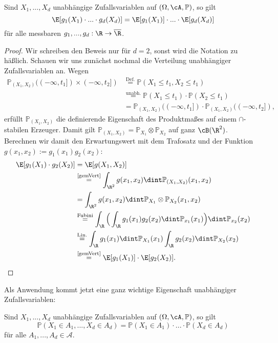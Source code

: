 \begin{satz}\label{un}
	Sind $X_1,...,X_d$ unabhängige Zufallsvariablen auf $(\Omega, \cA, \mathbb{P})$, so gilt
	$$ \E[g_1(X_1) \cdot ... \cdot g_d(X_d)] = \E[g_1(X_1)] \cdot ... \cdot \E[g_d(X_d)]$$
	f\"ur alle messbaren $g_1, ..., g_d: \R \to \overline \R$.
\end{satz}

\begin{proof}
	Wir schreiben den Beweis nur f\"ur $d=2$, sonst wird die Notation zu h\"a\ss lich. Schauen wir uns zun\"achst nochmal die Verteilung unabh\"angiger Zufallsvariablen an. Wegen
	 \begin{align*}
			\mathbb{P}_{(X_1,X_2)}((-\infty,t_1]) \times (-\infty,t_2]) 
			&\overset{\text{Def.}}{=} \mathbb{P}(X_1\leq t_1, X_2 \leq t_1) \\
			&\overset{\text{unabh.}}{=} \mathbb{P}(X_1\leq t_1) \cdot \mathbb{P}(X_2 \leq t_1) \\
			&= \mathbb{P}_{(X_1,X_2)}((-\infty,t_1]) \cdot \mathbb{P}_{(X_1,X_2)}((-\infty,t_2]),
		\end{align*}
		erf\"ullt $\mathbb{P}_{(X_1,X_2)}$ die definierende Eigenschaft des Produktma\ss es auf einem $\cap$-stabilen Erzeuger. Damit gilt $\mathbb{P}_{(X_1,X_2)} = \mathbb{P}_{X_1} \otimes \mathbb{P}_{X_2}$ auf ganz $\cB(\R^2)$. Berechnen wir damit den Erwartungswert mit dem Trafosatz und der Funktion $g(x_1,x_2):=g_1(x_1)g_2(x_2)$:
		 \begin{align*}
			\E[g_1(X_1) \cdot g_2(X_2)] &= \E[g(X_1,X_2)]\\
			&\overset{\text{\ref{gemVert}}}{=} \int_{\R^2} g(x_1,x_2) \dint \mathbb{P}_{(X_1,X_2)}(x_1,x_2)\\
			&= \int_{\R^2} g(x_1,x_2) \dint\mathbb{P}_{X_1} \otimes \mathbb{P}_{X_2}(x_1,x_2)\\
			&\overset{\text{Fubini}}{=} \int_{\R} \Big(\int_{\R} g_1(x_1) g_2(x_2) \dint\mathbb{P}_{x_1}(x_1)\Big) \dint\mathbb{P}_{x_2}(x_2)\\
			& \overset{\text{Lin.}}{=} \int_{\R} g_1(x_1) \dint\mathbb{P}_{X_1}(x_1) \int_{\R} g_2(x_2) \dint\mathbb{P}_{X_2}(x_2)\\
			&\overset{\text{\ref{gemVert}}}{=} \E[g_1(X_1)] \cdot \E[g_2(X_2)].
		\end{align*}
\end{proof}
Als Anwendung kommt jetzt eine ganz wichtige Eigenschaft unabh\"angiger Zufallsvariablen:
\begin{korollar}
	Sind $X_1,...,X_d$ unabhängige Zufallsvariablen auf $(\Omega, \cA, \mathbb{P})$, so gilt $$\mathbb{P}(X_1 \in A_1,...,X_d \in A_d) = \mathbb{P}(X_1 \in A_1) \cdot ... \cdot \mathbb{P}(X_d \in A_d)$$ f\"ur alle $A_1, ..., A_d\in \mathcal A$.
\end{korollar}

